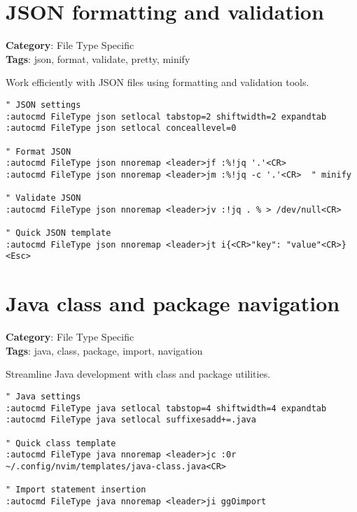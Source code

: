 {{{{{{\section{JSON formatting and validation}

\textbf{Category}: File Type Specific\\ \textbf{Tags}: json, format, validate, pretty, minify
\vspace{0.5cm}

Work efficiently with JSON files using formatting and validation tools.

\begin{Exa*}{}
\begin{Verbatim}[fontsize=\footnotesize, breaklines, breakanywhere]
" JSON settings
:autocmd FileType json setlocal tabstop=2 shiftwidth=2 expandtab
:autocmd FileType json setlocal conceallevel=0

" Format JSON
:autocmd FileType json nnoremap <leader>jf :%!jq '.'<CR>
:autocmd FileType json nnoremap <leader>jm :%!jq -c '.'<CR>  " minify

" Validate JSON
:autocmd FileType json nnoremap <leader>jv :!jq . % > /dev/null<CR>

" Quick JSON template
:autocmd FileType json nnoremap <leader>jt i{<CR>"key": "value"<CR>}<Esc>
\end{Verbatim}
\end{Exa*}

\section{Java class and package navigation}

\textbf{Category}: File Type Specific\\ \textbf{Tags}: java, class, package, import, navigation
\vspace{0.5cm}

Streamline Java development with class and package utilities.

\begin{Exa*}{}
\begin{Verbatim}[fontsize=\footnotesize, breaklines, breakanywhere]
" Java settings
:autocmd FileType java setlocal tabstop=4 shiftwidth=4 expandtab
:autocmd FileType java setlocal suffixesadd+=.java

" Quick class template
:autocmd FileType java nnoremap <leader>jc :0r ~/.config/nvim/templates/java-class.java<CR>

" Import statement insertion
:autocmd FileType java nnoremap <leader>ji ggOimport 


\end{Verbatim}
\end{Exa*}}}}}}}
